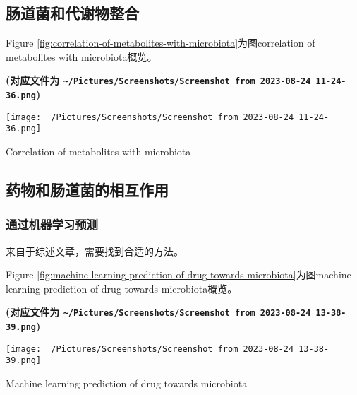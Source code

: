 \documentclass[
]{article}
\begin{document}
\hypertarget{ux80a0ux9053ux83ccux548cux4ee3ux8c22ux7269ux6574ux5408}{%
\subsection{肠道菌和代谢物整合}\label{ux80a0ux9053ux83ccux548cux4ee3ux8c22ux7269ux6574ux5408}}

Figure \ref{fig:correlation-of-metabolites-with-microbiota}为图correlation of metabolites with microbiota概览。

\textbf{(对应文件为 \texttt{\textasciitilde{}/Pictures/Screenshots/Screenshot\ from\ 2023-08-24\ 11-24-36.png})}

\def\@captype{figure}
\begin{center}
\texttt{[image: ~/Pictures/Screenshots/Screenshot from 2023-08-24 11-24-36.png]}
\caption{Correlation of metabolites with microbiota}\label{fig:correlation-of-metabolites-with-microbiota}
\end{center}

\hypertarget{ux836fux7269ux548cux80a0ux9053ux83ccux7684ux76f8ux4e92ux4f5cux7528}{%
\subsection{药物和肠道菌的相互作用}\label{ux836fux7269ux548cux80a0ux9053ux83ccux7684ux76f8ux4e92ux4f5cux7528}}

\hypertarget{ux901aux8fc7ux673aux5668ux5b66ux4e60ux9884ux6d4b}{%
\subsubsection{通过机器学习预测}\label{ux901aux8fc7ux673aux5668ux5b66ux4e60ux9884ux6d4b}}

来自于综述文章，需要找到合适的方法。

Figure \ref{fig:machine-learning-prediction-of-drug-towards-microbiota}为图machine learning prediction of drug towards microbiota概览。

\textbf{(对应文件为 \texttt{\textasciitilde{}/Pictures/Screenshots/Screenshot\ from\ 2023-08-24\ 13-38-39.png})}

\def\@captype{figure}
\begin{center}
\texttt{[image: ~/Pictures/Screenshots/Screenshot from 2023-08-24 13-38-39.png]}
\caption{Machine learning prediction of drug towards microbiota}\label{fig:machine-learning-prediction-of-drug-towards-microbiota}
\end{center}
\end{document}
